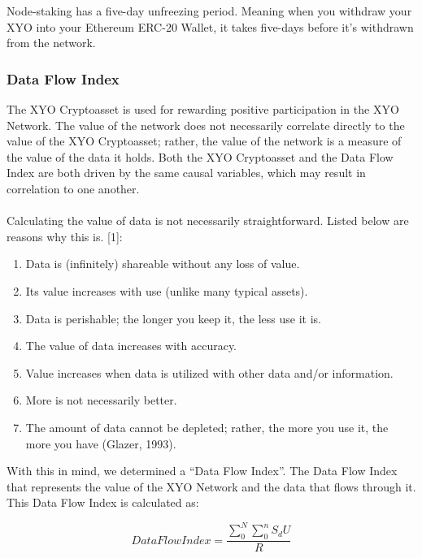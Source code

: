 \documentclass{article}
\begin{document}
Node-staking has a five-day unfreezing period. Meaning when you withdraw your XYO into your Ethereum ERC-20 Wallet, it takes five-days before it’s withdrawn from the network.

\subsubsection{Data Flow Index}

The XYO Cryptoasset is used for rewarding positive participation in the XYO Network. The value of the network does not necessarily correlate directly to the value of the XYO Cryptoasset; rather, the value of the network is a measure of the value of the data it holds. Both the XYO Cryptoasset and the Data Flow Index are both driven by the same causal variables, which may result in correlation to one another. \\\\

Calculating the value of data is not necessarily straightforward. Listed below are reasons why this is. [1]:

\begin{enumerate}
  \item Data is (infinitely) shareable without any loss of value.
  \item Its value increases with use (unlike many typical assets).
  \item Data is perishable; the longer you keep it, the less use it is.
  \item The value of data increases with accuracy.
  \item Value increases when data is utilized with other data and/or information.
  \item More is not necessarily better.
  \item The amount of data cannot be depleted; rather, the more you use it, the more you have (Glazer, 1993).
\end{enumerate}
With this in mind, we determined a ``Data Flow Index''. The Data Flow Index that represents the value of the XYO Network and the data that flows through it. This Data Flow Index is calculated as:

\begin{equation}
Data Flow Index = \frac{\sum_{0}^{N}\sum_{0}^{n}S_dU}{R}
\end{equation}
\end{document}
